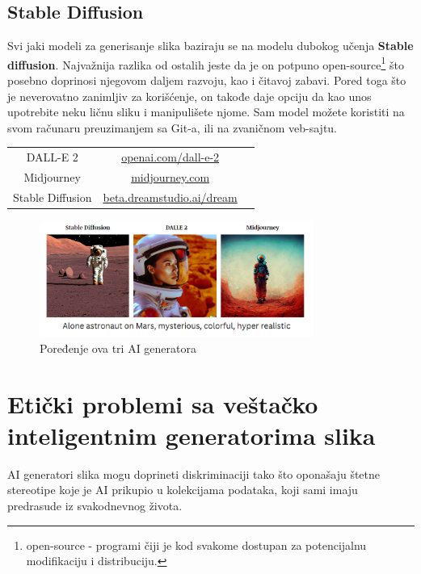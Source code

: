 \documentclass[12pt, letterpaper]{article}
\begin{document}
\subsection{Stable Diffusion}
Svi jaki modeli za generisanje slika baziraju se na modelu dubokog učenja \textbf{Stable diffusion}. Najvažnija razlika od ostalih jeste da je on potpuno open-source\footnote{open-source - programi čiji je kod svakome dostupan za potencijalnu modifikaciju i distribuciju.} što posebno doprinosi njegovom daljem razvoju, kao i čitavoj zabavi. Pored toga što je neverovatno zanimljiv za korišćenje, on takođe daje opciju da kao unos upotrebite neku ličnu sliku i manipulišete njome. Sam model možete koristiti na svom računaru preuzimanjem sa Git-a, ili na zvaničnom veb-sajtu.
\begin{center}
\begin{tabular}{ |c|c|c| } 
 \hline
 DALL-E 2 & \href{https://openai.com/dall-e-2/}{openai.com/dall-e-2} \\
 Midjourney & \href{https://www.midjourney.com/}{midjourney.com} \\
 Stable Diffusion & \href{https://beta.dreamstudio.ai/dream}{beta.dreamstudio.ai/dream} \\
 \hline
\end{tabular}
\end{center}

\begin{figure}[htp]
\centering
\includegraphics[width=0.8\textwidth]{astronaut.png}
\caption{Poređenje ova tri AI generatora}
\label{fig: Astronaut}
\end{figure}

\section{Etički problemi sa veštačko inteligentnim generatorima slika}

AI generatori slika mogu doprineti diskriminaciji tako što oponašaju štetne stereotipe koje je AI prikupio u kolekcijama podataka, koji sami imaju predrasude iz svakodnevnog života.
\end{document}
